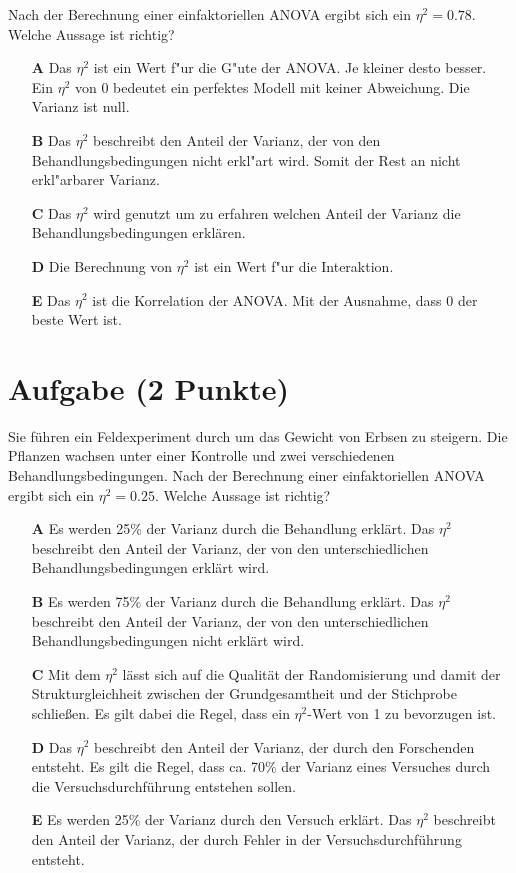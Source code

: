 \documentclass[a4paper, 9pt]{scrartcl}\usepackage[]{graphicx}\usepackage[]{xcolor}
\begin{document}
Nach der Berechnung einer einfaktoriellen ANOVA ergibt sich ein $\eta^2 = 0.78$. Welche Aussage ist richtig?



\begin{enumerate}
\item [\textbf{A} \msquare] Das $\eta^2$ ist ein Wert f{"u}r die G{"u}te der ANOVA. Je kleiner desto besser. Ein $\eta^2$ von 0 bedeutet ein perfektes Modell mit keiner Abweichung. Die Varianz ist null.
\item [\textbf{B} \msquare] Das $\eta^2$ beschreibt den Anteil der Varianz, der von den Behandlungsbedingungen nicht erkl{"a}rt wird. Somit der Rest an nicht erkl{"a}rbarer Varianz.
\item [\textbf{C} \msquare] Das $\eta^2$ wird genutzt um zu erfahren welchen Anteil der Varianz die Behandlungsbedingungen erklären.
\item [\textbf{D} \msquare] Die Berechnung von $\eta^2$ ist ein Wert f{"u}r die Interaktion.
\item [\textbf{E} \msquare] Das $\eta^2$ ist die Korrelation der ANOVA. Mit der Ausnahme, dass 0 der beste Wert ist.
\end{enumerate} 

\section{Aufgabe \hfill (2 Punkte)}



Sie führen ein Feldexperiment durch um das Gewicht von Erbsen zu
steigern. Die Pflanzen wachsen unter einer Kontrolle und zwei verschiedenen
Behandlungsbedingungen. Nach der Berechnung einer einfaktoriellen ANOVA
ergibt sich ein $\eta^2 = 0.25$. Welche Aussage ist richtig?



\begin{enumerate}
\item [\textbf{A} \msquare] Es werden 25\% der Varianz durch die Behandlung erklärt. Das $\eta^2$ beschreibt den Anteil der Varianz, der von den unterschiedlichen Behandlungsbedingungen erklärt wird.
\item [\textbf{B} \msquare] Es werden 75\% der Varianz durch die Behandlung erklärt. Das $\eta^2$ beschreibt den Anteil der Varianz, der von den unterschiedlichen Behandlungsbedingungen nicht erklärt wird.
\item [\textbf{C} \msquare] Mit dem $\eta^2$ lässt sich auf die Qualität der Randomisierung und damit der Strukturgleichheit zwischen der Grundgesamtheit und der Stichprobe schließen. Es gilt dabei die Regel, dass ein $\eta^2$-Wert von 1 zu bevorzugen ist.
\item [\textbf{D} \msquare] Das $\eta^2$ beschreibt den Anteil der Varianz, der durch den Forschenden entsteht. Es gilt die Regel, dass ca. 70\% der Varianz eines Versuches durch die Versuchsdurchführung entstehen sollen.
\item [\textbf{E} \msquare] Es werden 25\% der Varianz durch den Versuch erklärt. Das $\eta^2$ beschreibt den Anteil der Varianz, der durch Fehler in der Versuchsdurchführung entsteht.
\end{enumerate} 
\end{document}
